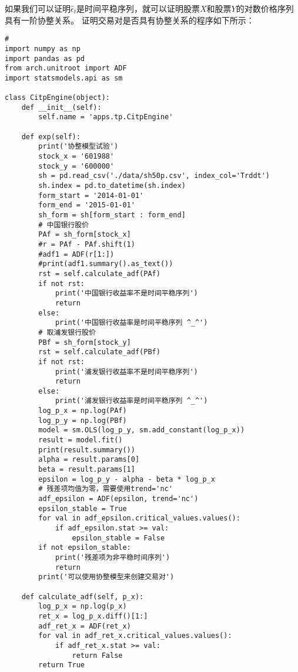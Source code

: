 如果我们可以证明$\hat{\epsilon} _{t}$是时间平稳序列，就可以证明股票$X$和股票$Y$的对数价格序列具有一阶协整关系。\newline
证明交易对是否具有协整关系的程序如下所示：
\begin{lstlisting}
#
import numpy as np
import pandas as pd
from arch.unitroot import ADF
import statsmodels.api as sm

class CitpEngine(object):
    def __init__(self):
        self.name = 'apps.tp.CitpEngine'

    def exp(self):
        print('协整模型试验')
        stock_x = '601988'
        stock_y = '600000'
        sh = pd.read_csv('./data/sh50p.csv', index_col='Trddt')
        sh.index = pd.to_datetime(sh.index)
        form_start = '2014-01-01'
        form_end = '2015-01-01'
        sh_form = sh[form_start : form_end]      
        # 中国银行股价
        PAf = sh_form[stock_x]
        #r = PAf - PAf.shift(1)
        #adf1 = ADF(r[1:])
        #print(adf1.summary().as_text())
        rst = self.calculate_adf(PAf)
        if not rst:
            print('中国银行收益率不是时间平稳序列')
            return 
        else:
            print('中国银行收益率是时间平稳序列 ^_^')
        # 取浦发银行股价
        PBf = sh_form[stock_y]
        rst = self.calculate_adf(PBf)
        if not rst:
            print('浦发银行收益率不是时间平稳序列')
            return 
        else:
            print('浦发银行收益率是时间平稳序列 ^_^')
        log_p_x = np.log(PAf)
        log_p_y = np.log(PBf)
        model = sm.OLS(log_p_y, sm.add_constant(log_p_x))
        result = model.fit()
        print(result.summary())
        alpha = result.params[0]
        beta = result.params[1]
        epsilon = log_p_y - alpha - beta * log_p_x
        # 残差项均值为零，需要使用trend='nc'
        adf_epsilon = ADF(epsilon, trend='nc')
        epsilon_stable = True
        for val in adf_epsilon.critical_values.values():
            if adf_epsilon.stat >= val:
                epsilon_stable = False
        if not epsilon_stable:
            print('残差项为非平稳时间序列')
            return 
        print('可以使用协整模型来创建交易对')

    def calculate_adf(self, p_x):
        log_p_x = np.log(p_x)
        ret_x = log_p_x.diff()[1:]
        adf_ret_x = ADF(ret_x)
        for val in adf_ret_x.critical_values.values():
            if adf_ret_x.stat >= val:
                return False
        return True
\end{lstlisting}
